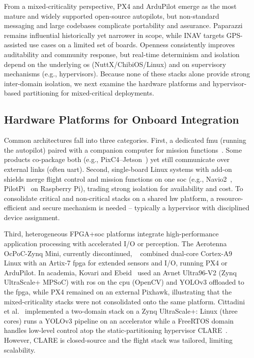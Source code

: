 From a mixed-criticality perspective, PX4 and ArduPilot emerge as the most
mature and widely supported open-source autopilots, but non-standard messaging and large codebases
complicate portability and assurance. Paparazzi remains influential historically
yet narrower in scope, while INAV targets GPS-assisted use cases on a limited
set of boards. Openness consistently improves auditability and community
response, but real-time determinism and isolation depend on the underlying \gls{os}
(NuttX/ChibiOS/Linux) and on supervisory mechanisms (e.g., hypervisors).
Because none of these stacks alone provide strong inter-domain isolation, we
next examine the hardware platforms and hypervisor-based partitioning for mixed-critical deployments.

\subsection{Hardware Platforms for Onboard Integration}
\label{subsec:rw-hw-context}
Common architectures fall into three categories.
First, a dedicated \gls{fmu} (running the autopilot) paired with a companion
computer for mission functions~\cite{pixhawk4,arduPilot-cuavV5}. Some products
co-package both (e.g., PixC4–Jetson~\cite{jetson-docs}) yet still communicate
over external links (often \gls{uart}).
%
Second, single-board Linux systems with add-on shields merge flight control and
mission functions on one \gls{soc} (e.g., Navio2~\cite{navio2-px4},
PilotPi~\cite{px4-pilotpi} on Raspberry Pi), trading strong isolation for
availability and cost. To consolidate critical and non-critical stacks on a
shared \gls{hw} platform, a resource-efficient and secure mechanism is
needed -- typically a hypervisor with disciplined device assignment.

Third, heterogeneous FPGA+\gls{soc} platforms integrate high-performance
application processing with accelerated I/O or perception. The Aerotenna
OcPoC-Zynq Mini, currently discontinued, ~\cite{ocpoc,ocpoc-discontinued} combined dual-core Cortex-A9
Linux with an Artix-7 \gls{fpga} for extended sensors and I/O, running PX4 or
ArduPilot. In academia, Kovari and Ebeid~\cite{kovari_mpdrone_2021} used an
Avnet Ultra96-V2 (Zynq UltraScale+ MPSoC) with \gls{ros} on the \gls{cpu} (OpenCV) and
YOLOv3 offloaded to the \gls{fpga}, while PX4 remained on an external
Pixhawk, illustrating that the mixed-criticality stacks were not consolidated
onto the same platform. Cittadini et al.~\cite{cittadini_supporting_2023}
implemented a two-domain stack on a Zynq UltraScale+: Linux (three cores) runs a
YOLOv3 pipeline on an accelerator while a FreeRTOS domain handles low-level
control atop the static-partitioning hypervisor CLARE~\cite{clare-home}.
However, CLARE is closed-source and the flight stack was tailored, limiting
scalability.

